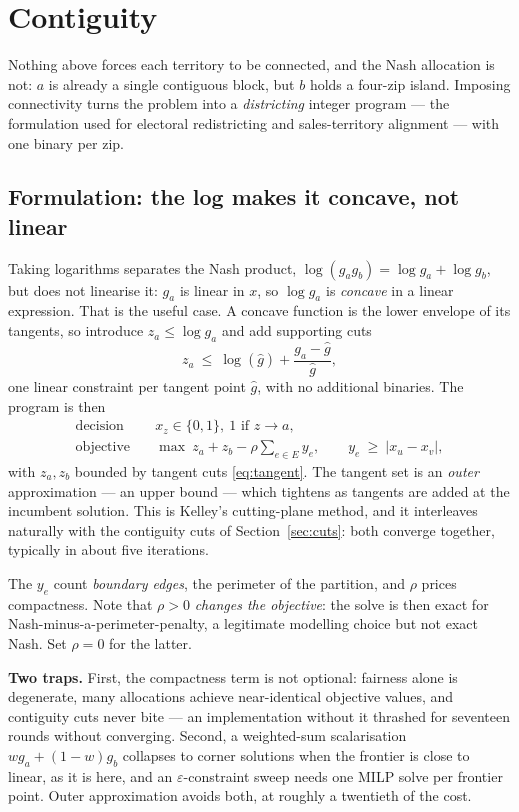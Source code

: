 \documentclass[11pt]{article}
\theoremstyle{remark}\newtheorem*{remark}{Remark}
\begin{document}
\section{Contiguity}\label{sec:contig}
Nothing above forces each territory to be connected, and the Nash allocation is not:
$a$ is already a single contiguous block, but $b$ holds a four-zip island. Imposing
connectivity turns the problem into a \emph{districting} integer program --- the
formulation used for electoral redistricting and sales-territory alignment --- with one
binary per zip.

\subsection{Formulation: the log makes it concave, not linear}
Taking logarithms separates the Nash product, $\log(g_ag_b)=\log g_a+\log g_b$, but does
not linearise it: $g_a$ is linear in $x$, so $\log g_a$ is \emph{concave} in a linear
expression. That is the useful case. A concave function is the lower envelope of its
tangents, so introduce $z_a\le\log g_a$ and add supporting cuts
\begin{equation}\label{eq:tangent}
z_a\ \le\ \log(\hat g)+\frac{g_a-\hat g}{\hat g},
\end{equation}
one linear constraint per tangent point $\hat g$, with no additional binaries. The
program is then
\begin{align}
\text{decision}\quad & x_z\in\{0,1\},\ 1 \text{ if } z\to a,\\
\text{objective}\quad & \max\ z_a+z_b-\rho\textstyle\sum_{e\in E}y_e,
\qquad y_e\ \ge\ |x_u-x_v| ,
\end{align}
with $z_a,z_b$ bounded by tangent cuts \eqref{eq:tangent}. The tangent set is an
\emph{outer} approximation --- an upper bound --- which tightens as tangents are added
at the incumbent solution. This is Kelley's cutting-plane method, and it interleaves
naturally with the contiguity cuts of Section~\ref{sec:cuts}: both converge together,
typically in about five iterations.

The $y_e$ count \emph{boundary edges}, the perimeter of the partition, and $\rho$
prices compactness. Note that $\rho>0$ \emph{changes the objective}: the solve is then
exact for Nash-minus-a-perimeter-penalty, a legitimate modelling choice but not exact
Nash. Set $\rho=0$ for the latter.

\begin{warnbox}
\textbf{Two traps.} First, the compactness term is not optional: fairness alone is
degenerate, many allocations achieve near-identical objective values, and contiguity
cuts never bite --- an implementation without it thrashed for seventeen rounds without
converging. Second, a weighted-sum scalarisation $wg_a+(1-w)g_b$ collapses to corner
solutions when the frontier is close to linear, as it is here, and an
$\varepsilon$-constraint sweep needs one MILP solve per frontier point. Outer
approximation avoids both, at roughly a twentieth of the cost.
\end{warnbox}
\end{document}
